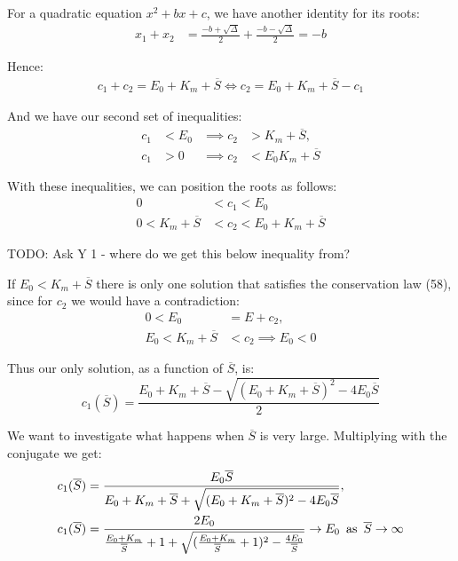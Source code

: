 \documentclass[12pt]{article}
\begin{document}
For a quadratic equation $x^2 + bx + c$, we have another identity for
its roots:
\begin{align}
  x_1 + x_2 &= \frac{-b + \sqrt{\Delta}}{2} + \frac{-b - \sqrt{\Delta}}{2} = -b
\end{align}

Hence:
\begin{align}
  c_1 + c_2 = E_0 + K_m + \overline{S} \iff c_2 = E_0 + K_m + \overline{S} - c_1
\end{align}

And we have our second set of inequalities:
\begin{align}
  c_1 &< E_0 &\implies c_2 &> K_m + \overline{S}, \\
  c_1 &> 0 &\implies c_2 &< E_0 K_m + \overline{S}
\end{align}

With these inequalities, we can position the roots as follows:
\begin{align}
  0 &< c_1 < E_0 \\
  0 < K_m + \overline{S} &< c_2 < E_0 + K_m + \overline{S}
\end{align}

TODO: Ask Y 1 - where do we get this below inequality from?

If $E_0 < K_m + \overline{S}$ there is only one solution that
satisfies the conservation law (58), since for $c_2$ we would have a
contradiction:
\begin{align}
  0 < E_0 &= E + c_2, \\
  E_0 < K_m + \overline{S} &< c_2 \implies E_0 < 0
\end{align}

Thus our only solution, as a function of $\overline{S}$, is:
\begin{equation}
  c_1(\overline{S}) = \frac{E_0 + K_m + \overline{S} - \sqrt{(E_0 +
      K_m + \overline{S})^2 - 4 E_0 \overline{S}}}{2}
\end{equation}

We want to investigate what happens when $\overline{S}$ is very
large. Multiplying with the conjugate we get:
\begin{align}
  c_1(\overline{S}) &= \frac{E_0 \overline{S}}{E_0 + K_m + \overline{S} +
    \sqrt{(E_0 +K_m + \overline{S})^2 - 4 E_0 \overline{S}}}, \\
  c_1(\overline{S}) &= \frac{2 E_0}{\frac{E_0 + K_m}{\overline{S}} + 1 +
    \sqrt{(\frac{E_0 + K_m}{\overline{S}} + 1)^2 - \frac{4 E_0}{\overline{S}}}}
  \to  E_0 \enskip \text{as} \enskip \overline{S} \to \infty
\end{align}
\end{document}
